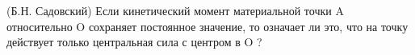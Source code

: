 (Б.Н. Садовский)
Если кинетический момент материальной точки A относительно O сохраняет
постоянное значение, то означает ли это, что на точку действует
только центральная сила с центром в O ?
